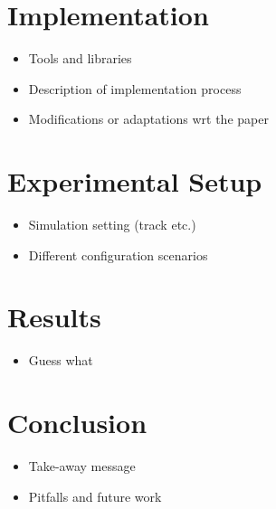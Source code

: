 \documentclass[a4paper, twocolumn, 11pt, twoside]{article}
\begin{document}
\section{Implementation}

\begin{itemize}
    \item Tools and libraries
    \item Description of implementation process
    \item Modifications or adaptations wrt the paper
\end{itemize}

\section{Experimental Setup}

\begin{itemize}
    \item Simulation setting (track etc.)
    \item Different configuration scenarios
\end{itemize}

\section{Results}

\begin{itemize}
    \item Guess what
\end{itemize}

\section{Conclusion}

\begin{itemize}
    \item Take-away message
    \item Pitfalls and future work
\end{itemize}



\end{document}
